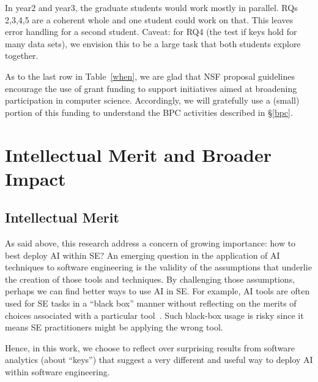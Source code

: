 In year2 and year3, the graduate students would work mostly  in parallel. RQs 2,3,4,5
are a coherent whole and one student could work on that. This leaves error 
handling  for a second student. Caveat: for RQ4 (the test if keys hold for many data sets),
we envision this to be a large task that both students explore together.

As to the last row in Table~\ref{when}, we are glad that NSF proposal guidelines encourage the use of  grant funding to support
initiatives aimed at  broadening participation in computer science. Accordingly, we will gratefully use a (small) portion
of this funding to understand the BPC activities described in \S\ref{bpc}.

\section{Intellectual Merit and Broader Impact}\label{sec:IM-BI}
\subsection{Intellectual Merit}
As said above, 
this research address a concern of growing importance: how to  best deploy
 AI within SE? 
 An emerging question in the
application of AI techniques to software engineering is the validity
of the assumptions that underlie the creation of those tools and
techniques.  By challenging those assumptions, perhaps we can find better
ways to use AI in SE.
For example, 
AI tools are
often used for SE tasks  in a ``black box'' manner without reflecting on the merits
of choices associated with a particular tool~\cite{Binkley:2018,Novielli:2018}. 
Such black-box usage is risky since it means SE practitioners
might be applying the wrong tool. 

Hence, in this work, we  choose to reflect over  surprising results
from software analytics (about ``keys'')  that suggest a very different and useful way to deploy AI within software engineering. 

